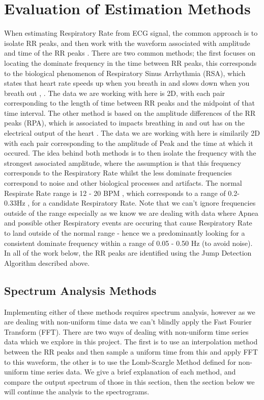 \chapter{Evaluation of Estimation Methods}

When estimating Respiratory Rate from ECG signal, the common approach is to isolate RR peaks, and then work with the 
waveform associated with amplitude and time of the RR peaks \cite{MIRMOHAMADSADEGHI201466}. There are two common methods; the first focuses on locating 
the dominate frequency in the time between RR peaks, this corresponds to the biological phenomenon of 
Respiratory Sinus Arrhythmia (RSA), which states that heart rate speeds up when you breath in and slows down when you breath out
\cite{clevelandclinic_sinus_arrhythmia}, \cite{MIRMOHAMADSADEGHI201466}. The data we are working with here is 2D, with each pair corresponding 
to the length of time between RR peaks and the midpoint of that time interval. The other method is based on the amplitude differences of the RR peaks (RPA),
which is associated to impacts breathing in and out has on the electrical output of the heart \cite{MIRMOHAMADSADEGHI201466}. The 
data we are working with here is similarily 2D with each pair corresponding to the amplitude of Peak and the time at which it occured.
The idea behind both methods is to then isolate the frequency with the strongest associated amplitude, where 
the assumption is that this frequency corresponds to the  Respiratory Rate whilst the less dominate frequencies correspond to noise 
and other biological processes and artifacts. The normal Respirate Rate range is 12 - 20 BPM \cite{chourpiliadis2022respiratory}, which corresponds to a range of  0.2- 0.33Hz , for a candidate
Respiratory Rate. Note that we can't ignore frequencies outside of the range especially as we know we are dealing with data where Apnea and possible
other Respiratory events are occuring that cause Respiratory Rate to land outside of the normal range - hence we a predominantly looking for a consistent
dominate frequency  within a range of 0.05 - 0.50 Hz (to avoid noise). In all of the work below, the RR peaks are identified 
using the Jump Detection Algorithm described above.  

\section{Spectrum Analysis Methods}
Implementing either of these methods requires spectrum analysis, however as we are dealing with non-uniform time data we can't blindly
apply the Fast Fourier Transform (FFT). There are two ways of dealing with non-uniform time series data which we explore in 
this project. The first is to use an interpolation method between the RR peaks and then sample a uniform time 
from this and apply FFT to this waveform, the other is to use the Lomb-Scargle Method defined for non-uniform time 
series data. We give a brief explanation of each method, and compare the output spectrum of those in this section, then the section below we will continue the analysis to 
the spectrograms. 

